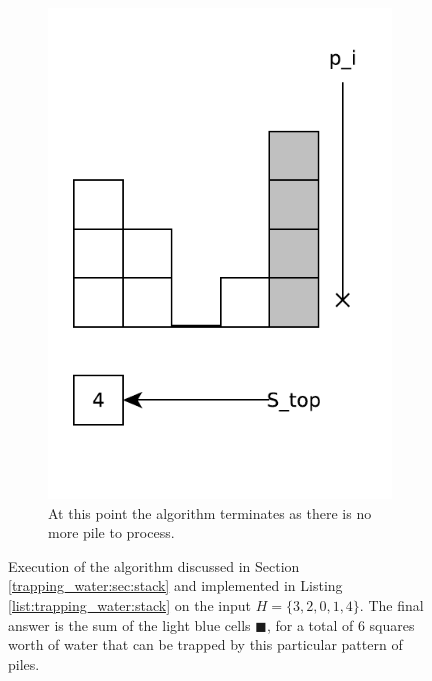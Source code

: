 \begin{figure}
\begin{subfigure}[t]{0.24\textwidth}
		\includegraphics[width=1\linewidth]{sources/trapping_water/images/stack_ex8}
		\caption{At this point the algorithm terminates as there is no more pile to process.}
		\label{fig:trapping_water:stack_ex3}
	 \end{subfigure}
	 \caption[Execution of the stack based algorithm.]{Execution of the algorithm discussed in Section \ref{trapping_water:sec:stack} and implemented in Listing \ref{list:trapping_water:stack} on the input $H=\{3,2,0,1,4\}$. The final answer is the sum of the light blue cells \textcolor[HTML]{99ccff}{$\blacksquare$}, for a total of $6$ squares worth of water that can be trapped by this particular pattern of piles.}
	 \label{fig:trapping_water:stack_ex}
\end{figure}